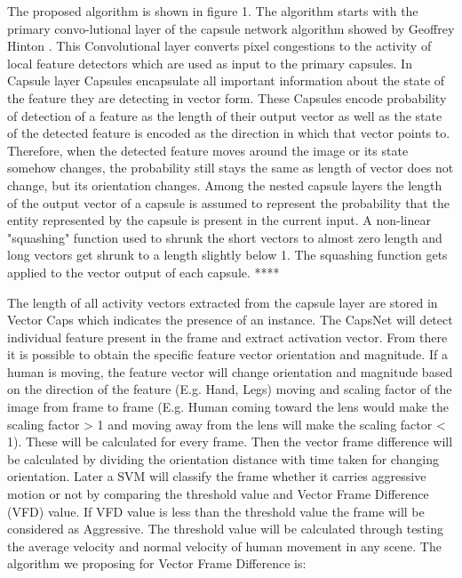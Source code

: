 \documentclass[11pt,english]{article}
\begin{document}
The proposed algorithm is shown in figure 1. The algorithm starts with the primary convo-lutional layer of the capsule network algorithm showed by Geoffrey Hinton \cite{sabour2017dynamic}. This Convolutional layer
converts pixel congestions to the activity of local feature detectors which are used as input to the
primary capsules. In Capsule layer Capsules encapsulate all important information about the state
of the feature they are detecting in vector form. These Capsules encode probability of detection of
a feature as the length of their output vector as well as the state of the detected feature is encoded
as the direction in which that vector points to. Therefore, when the detected feature moves around the image or its state somehow changes,
the probability still stays the same as length of vector does not change, but its orientation changes.
Among the nested capsule layers the length of the output vector of a capsule is assumed to
represent the probability that the entity represented by the capsule is present in the current input.
A non-linear "squashing" function used to shrunk the short vectors to almost zero length and long vectors get shrunk to a length slightly below 1. The squashing function gets applied to the vector output of each capsule. ****

The length of all activity vectors extracted from the capsule layer are stored in Vector Caps
which indicates the presence of an instance. The CapsNet will detect individual feature present
in the frame and extract activation vector. From there it is possible to obtain the specific feature
vector orientation and magnitude. If a human is moving, the feature vector will change orientation
and magnitude based on the direction of the feature (E.g. Hand, Legs) moving and scaling factor
of the image from frame to frame (E.g. Human coming toward the lens would make the scaling
factor > 1 and moving away from the lens will make the scaling factor < 1). These will be
calculated for every frame. Then the vector frame difference will be calculated by dividing the
orientation distance with time taken for changing orientation. Later a SVM will classify the frame
whether it carries aggressive motion or not by comparing the threshold value and Vector Frame
Difference (VFD) value. If VFD value is less than the threshold value the frame will be considered
as Aggressive. The threshold value will be calculated through testing the average velocity and
normal velocity of human movement in any scene. The algorithm we proposing for Vector Frame
Difference is: 
\end{document}

